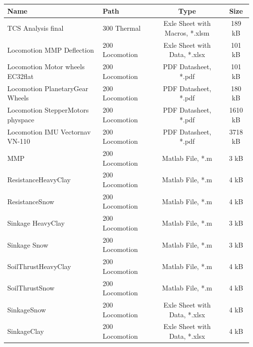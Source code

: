 \begin{table}[htb]
	\centering
	\begin{tabular}{llcc}
	\toprule
		Name  & Path & Type & Size  \\
	\midrule
		TCS Analysis final 					& 300 Thermal\ 		& Exle Sheet with Macros, *.xlsm 	& 189 kB  \\
		
		Locomotion MMP Deflection 			& 200 Locomotion\ & Exle Sheet with Data, *.xlsx	& 101 kB  \\	
		
		Locomotion Motor wheels EC32flat	& 200 Locomotion\ & PDF Datasheet, *.pdf	& 101 kB  \\	
		
		Locomotion PlanetaryGear Wheels		& 200 Locomotion\ & PDF Datasheet, *.pdf	& 180 kB  \\	
		
		Locomotion StepperMotors physpace	& 200 Locomotion\ & PDF Datasheet, *.pdf	& 1610 kB  \\
		
		Locomotion IMU Vectornav VN-110		& 200 Locomotion\ & PDF Datasheet, *.pdf	& 3718 kB  \\
		
		MMP 								& 200 Locomotion\ & Matlab File, *.m	& 3 kB  \\
		
		ResistanceHeavyClay					& 200 Locomotion\ & Matlab File, *.m	& 4 kB  \\
		
		ResistanceSnow						& 200 Locomotion\ & Matlab File, *.m	& 4 kB  \\
		
		Sinkage HeavyClay					& 200 Locomotion\ & Matlab File, *.m	& 3 kB  \\
		
		Sinkage Snow						& 200 Locomotion\ & Matlab File, *.m	& 3 kB  \\
		
		SoilThrustHeavyClay					& 200 Locomotion\ & Matlab File, *.m	& 4 kB  \\
		
		SoilThrustSnow						& 200 Locomotion\ & Matlab File, *.m	& 4 kB  \\
		
		SinkageSnow 						& 200 Locomotion\ & Exle Sheet with Data, *.xlsx	& 4 kB  \\	
		
		SinkageClay				 			& 200 Locomotion\ & Exle Sheet with Data, *.xlsx	& 4 kB  \\	
		

\end{tabular}
\end{table}
